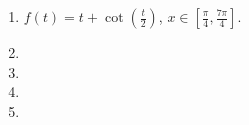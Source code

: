 \begin{multicols}{2}
\begin{enumerate}[ref={\fcProblemRef}]
\item $\displaystyle f(t)=t+\cot \left(\frac{t}{2}\right) $, $x\in [\frac{\pi}{4},\frac{7\pi}{4} ]$.
\item 
\item 
\item 
\item 
\end{enumerate}
\end{multicols}
